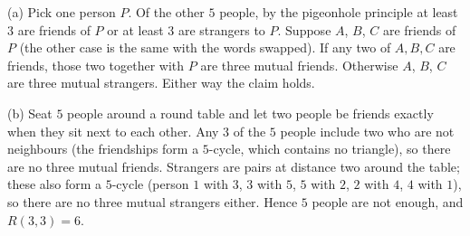 (a) Pick one person $P$. Of the other $5$ people, by the pigeonhole principle at least $3$ are friends of $P$ or at least $3$ are strangers to $P$. Suppose $A$, $B$, $C$ are friends of $P$ (the other case is the same with the words swapped). If any two of $A,B,C$ are friends, those two together with $P$ are three mutual friends. Otherwise $A$, $B$, $C$ are three mutual strangers. Either way the claim holds.

(b) Seat $5$ people around a round table and let two people be friends exactly when they sit next to each other. Any $3$ of the $5$ people include two who are not neighbours (the friendships form a $5$-cycle, which contains no triangle), so there are no three mutual friends. Strangers are pairs at distance two around the table; these also form a $5$-cycle (person $1$ with $3$, $3$ with $5$, $5$ with $2$, $2$ with $4$, $4$ with $1$), so there are no three mutual strangers either. Hence $5$ people are not enough, and $R(3,3)=\boxed{6}$.
